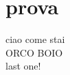 \documentclass{article}
\begin{document}
    \section{prova}
        ciao come stai\\
        ORCO BOIO\\
        last one!
\end{document}
